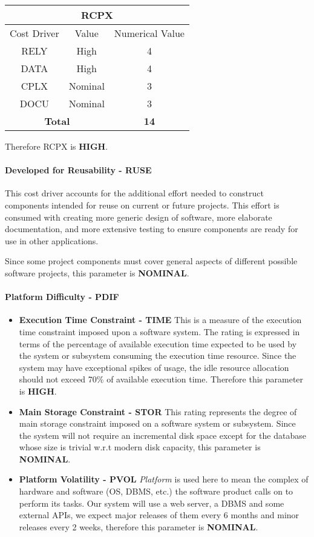 \begin{longtable}{ccc}
\multicolumn{3}{c}{\textbf{RCPX}}\\
\toprule
Cost Driver&Value&Numerical Value\\
\midrule
RELY&High&4\\
DATA&High&4\\
CPLX&Nominal&3\\
DOCU&Nominal&3\\
\midrule
\multicolumn{2}{c}{\textbf{Total}}&\textbf{14}\\
\bottomrule
\end{longtable}

Therefore RCPX is \textbf{HIGH}.

\paragraph{Developed for Reusability - RUSE} This cost driver accounts for the additional effort needed to construct components intended for reuse on current or future projects. This effort is consumed with creating more generic design of software, more elaborate documentation, and more extensive testing to ensure components are ready for use in other applications.

Since some project components must cover general aspects of different possible software projects, this parameter is \textbf{NOMINAL}.

\paragraph{Platform Difficulty - PDIF}
\begin{itemize}
	\item \textbf{Execution Time Constraint - TIME} This is a measure of the execution time constraint imposed upon a software system. The rating is expressed in terms of the percentage of available execution time expected to be used by the system or subsystem consuming the execution time resource. Since the system may have exceptional spikes of usage, the idle resource allocation should not exceed 70\% of available execution time. Therefore this parameter is \textbf{HIGH}.
	\item \textbf{Main Storage Constraint - STOR} This rating represents the degree of main storage constraint imposed on a software system or subsystem. Since the system will not require an incremental disk space except for the database whose size is trivial w.r.t modern disk capacity, this parameter is \textbf{NOMINAL}.
	\item \textbf{Platform Volatility - PVOL} \emph{Platform} is used here to mean the complex of hardware and software (OS, DBMS, etc.) the software product calls on to perform its tasks. Our system will use a web server, a DBMS and some external APIs, we expect major releases of them every 6 months and minor releases every 2 weeks, therefore this parameter is \textbf{NOMINAL}.
\end{itemize}

